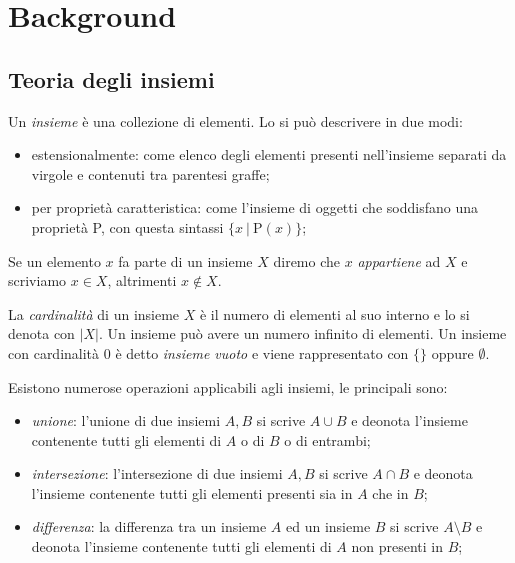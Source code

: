 \chapter{Background}\label{chapter:background}
\section{Teoria degli insiemi}
\begin{definition}[Insieme]
Un \textit{insieme} è una collezione di elementi. Lo si può descrivere in due modi: 
\begin{itemize}
    \item estensionalmente: come elenco degli elementi presenti nell'insieme separati da virgole e contenuti tra parentesi graffe;
    \item per proprietà caratteristica: come l'insieme di oggetti che soddisfano una proprietà P, con questa sintassi \(\{x\ |\ \textrm{P}(x)\}\);
\end{itemize}
\end{definition}

\begin{definition}[Appartenenza]
Se un elemento \(x\) fa parte di un insieme \(X\) diremo che \(x\) \textit{appartiene} ad \(X\) e scriviamo \(x\in X\), altrimenti \(x \notin X\).
\end{definition}

\begin{definition}[Cardinalità]
La \textit{cardinalità} di un insieme \(X\) è il numero di elementi al suo interno e lo si denota con \(|X|\). Un insieme può avere un numero infinito di elementi. Un insieme con cardinalità 0 è detto \textit{insieme vuoto} e viene rappresentato con \(\{\}\) oppure \(\emptyset\).
\end{definition}

\begin{definition}
Esistono numerose operazioni applicabili agli insiemi, le principali sono:
\begin{itemize}
    \item \textit{unione}: l'unione di due insiemi \(A, B\) si scrive \(A\cup B\) e deonota l'insieme contenente tutti gli elementi di \(A\) o di \(B\) o di entrambi;
    \item \textit{intersezione}: l'intersezione di due insiemi \(A, B\) si scrive \(A\cap B\) e deonota l'insieme contenente tutti gli elementi presenti sia in \(A\) che in \(B\);
    \item \textit{differenza}: la differenza tra un insieme \(A\) ed un insieme \(B\) si scrive \(A\setminus B\) e deonota l'insieme contenente tutti gli elementi di \(A\) non presenti in \(B\);
\end{itemize}
\end{definition}

